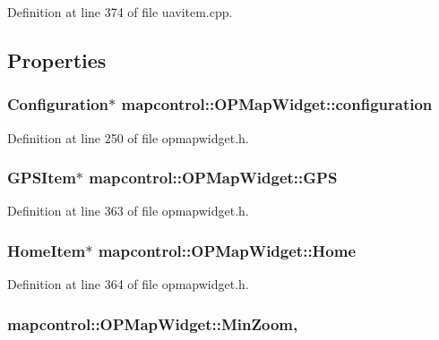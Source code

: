 Definition at line 374 of file uavitem.\-cpp.



\subsection{Properties}
\hypertarget{group___o_p_map_widget_gaa79e123990d6d7b2f1c45e5c2a56313d}{
\subsubsection[{configuration}]{\setlength{\rightskip}{0pt plus 5cm}Configuration$\ast$ mapcontrol\-::\-O\-P\-Map\-Widget\-::configuration}}\label{group___o_p_map_widget_gaa79e123990d6d7b2f1c45e5c2a56313d}


Definition at line 250 of file opmapwidget.\-h.

\hypertarget{group___o_p_map_widget_ga83798c623babeffb173d483ad1c84ccc}{
\subsubsection[{G\-P\-S}]{\setlength{\rightskip}{0pt plus 5cm}G\-P\-S\-Item$\ast$ mapcontrol\-::\-O\-P\-Map\-Widget\-::\-G\-P\-S}}\label{group___o_p_map_widget_ga83798c623babeffb173d483ad1c84ccc}


Definition at line 363 of file opmapwidget.\-h.

\hypertarget{group___o_p_map_widget_ga3c39e182c87b25990664fbe7dd0a9eff}{
\subsubsection[{Home}]{\setlength{\rightskip}{0pt plus 5cm}Home\-Item$\ast$ mapcontrol\-::\-O\-P\-Map\-Widget\-::\-Home}}\label{group___o_p_map_widget_ga3c39e182c87b25990664fbe7dd0a9eff}


Definition at line 364 of file opmapwidget.\-h.

\hypertarget{group___o_p_map_widget_gac91f92751a3ac3a5a10a6592d4213d42}{
\subsubsection[{Min\-Zoom}]{ mapcontrol\-::\-O\-P\-Map\-Widget\-::\-Min\-Zoom\hspace{0.3cm}{\ttfamily [read]}, {\ttfamily [write]}}}\label{group___o_p_map_widget_gac91f92751a3ac3a5a10a6592d4213d42}



